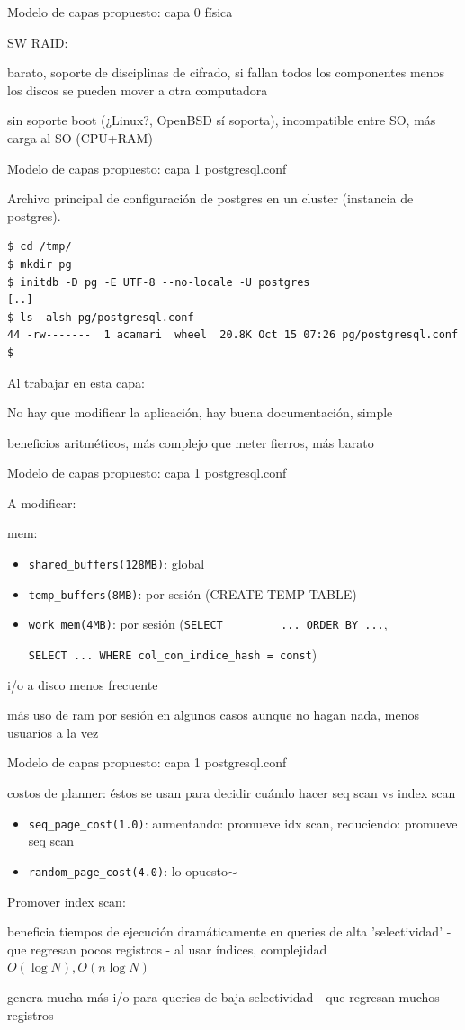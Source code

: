 \documentclass[11pt,spanish]{article}
\newcommand{\rowsp}[1][1em]{\vspace{#1}}
\newcommand{\hone}[1]{{\rowsp[0.3em]\noindent\Large #1 \rowsp[0.3em]}}
\newcommand{\myitm}[1]{\begin{itemize}#1\end{itemize}}
\newcommand{\mydesc}[1]{%
	\begin{description}
	\setlength\itemsep{0em}%
	#1
	\end{description}
}
\newcommand{\pros}{\item[pros:]}
\newcommand{\cons}{\item[cons:]}
\begin{document}
\newpage %
\hone{Modelo de capas propuesto: capa 0 física}
\mydesc{
	\item[SW RAID:]
		\mydesc{\pros barato, soporte de disciplinas de cifrado, 
				si fallan todos los componentes menos los discos
				se pueden mover a otra computadora
			\cons sin soporte boot (¿Linux?, OpenBSD sí soporta),
				incompatible entre SO, más carga al SO (CPU+RAM)
		}
}

\newpage %
\hone{Modelo de capas propuesto: capa 1 postgresql.conf}

Archivo principal de configuración de postgres en un cluster (instancia de
postgres).

\begin{lstlisting}
$ cd /tmp/
$ mkdir pg
$ initdb -D pg -E UTF-8 --no-locale -U postgres
[..]
$ ls -alsh pg/postgresql.conf
44 -rw-------  1 acamari  wheel  20.8K Oct 15 07:26 pg/postgresql.conf
$ 
\end{lstlisting}

Al trabajar en esta capa:
\mydesc{\pros No hay que modificar la aplicación, hay buena documentación,
		simple
	\cons beneficios aritméticos, más complejo  que meter fierros, más barato}

\newpage %
\hone{Modelo de capas propuesto: capa 1 postgresql.conf}

A modificar:
\mydesc{
	\item[mem:] \ 
	\myitm{
		\item \lstinline!shared_buffers(128MB)!: global
		\item \lstinline!temp_buffers(8MB)!: por sesión
			(CREATE TEMP TABLE)
		\item \lstinline!work_mem(4MB)!: por sesión (\lstinline!SELECT
		... ORDER BY ...!,

		\lstinline!SELECT ... WHERE col_con_indice_hash = const!)
	}
	\mydesc{
		\pros i/o a disco menos frecuente
		\cons más uso de ram por sesión  en algunos casos aunque no
		hagan nada, menos usuarios a la vez}
}

\newpage %
\hone{Modelo de capas propuesto: capa 1 postgresql.conf}

\mydesc{
	\item[costos de planner:] éstos se usan para decidir cuándo
	hacer seq scan vs index scan
	\myitm{
		\item \lstinline!seq_page_cost(1.0)!: aumentando: promueve idx
		scan, reduciendo: promueve seq scan
		\item \lstinline!random_page_cost(4.0)!: lo opuesto$\sim$
	}

	Promover index scan:
	\mydesc{
		\pros beneficia tiempos de ejecución dramáticamente en queries
			de alta 'selectividad' - que regresan pocos registros -
			al usar índices, complejidad $O(\log N), O(n \log N)$
		\cons genera mucha más i/o para queries de baja selectividad -
			que regresan muchos registros
	}

}
\end{document}
